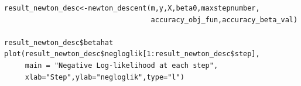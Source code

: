 \documentclass{article}
\begin{document}
\begin{lstlisting}
result_newton_desc<-newton_descent(m,y,X,beta0,maxstepnumber,
                                   accuracy_obj_fun,accuracy_beta_val)

result_newton_desc$betahat
plot(result_newton_desc$negloglik[1:result_newton_desc$step],
     main = "Negative Log-likelihood at each step",
     xlab="Step",ylab="negloglik",type="l")
\end{lstlisting}
\end{document}
